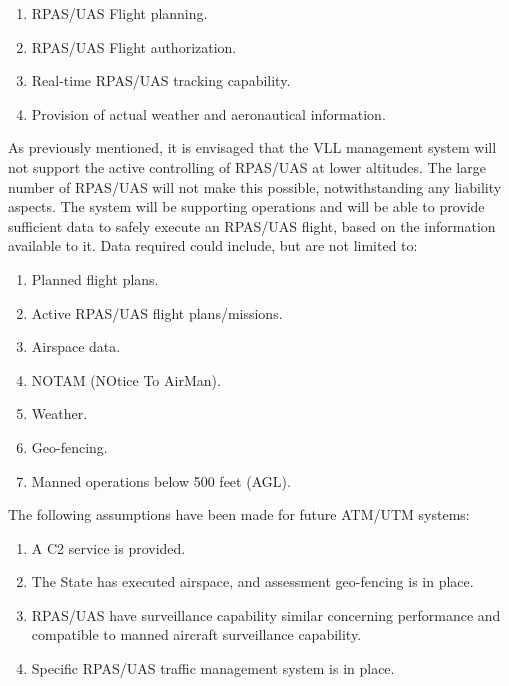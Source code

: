 \begin{enumerate}
    \item  RPAS/UAS Flight planning.
    
    \item  RPAS/UAS Flight authorization.
    
    \item  Real-time RPAS/UAS tracking capability.
    
    \item  Provision of actual weather and aeronautical information.
\end{enumerate}

\noindent As previously mentioned, it is envisaged that the VLL management system will not support the active controlling of RPAS/UAS at lower altitudes. The large number of RPAS/UAS will not make this possible, notwithstanding any liability aspects. The system will be supporting operations and will be able to provide sufficient data to safely execute an RPAS/UAS flight, based on the information available to it. Data required could include, but are not limited to:

\begin{enumerate}
    \item Planned flight plans.

    \item Active RPAS/UAS flight plans/missions.

    \item Airspace data.

    \item NOTAM (NOtice To AirMan).
    
    \item Weather.


    \item Geo-fencing.

    \item Manned operations below 500 feet (AGL).
\end{enumerate}



\noindent The following assumptions have been made for future ATM/UTM systems:
\begin{enumerate}
    \item A C2 service is provided.

    \item The State has executed airspace, and assessment geo-fencing is in place.
    
    \item  RPAS/UAS have surveillance capability similar concerning performance and compatible to manned aircraft surveillance capability.
    
    \item  Specific RPAS/UAS traffic management system is in place.
\end{enumerate}

